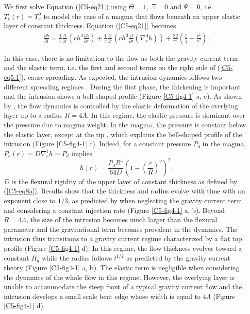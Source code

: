 We first solve Equation  (\ref{C5-eq21}) using $\Theta=1$, $\Xi=0$ and
$\Psi=0$,  i.e. $T_e(r)=T_{e}^0$  to model  the case  of a  magma that
flows beneath an  upper elastic layer of  constant thickness. Equation
(\ref{C5-eq21}) becomes		
\begin{eqnarray}
  \frac{\partial h}{\partial t}=\frac{1}{r} \frac{\partial}{\partial r}\left (rh^{3} \frac{\partial h}{\partial r} \right)+ \frac{1}{r}\frac{\partial}{\partial r}\left ( rh^{3} \frac{\partial}{\partial r}\left ( \nabla^{4}_{r}h \right )\right)+\frac{32}{\gamma^{2}} \left(\frac{1}{4}-\frac{r^{2}}{\gamma^{2}}\right).
  \label{C5-eq5.1}
\end{eqnarray}

In this case, there  is no limitation to the flow  as both the gravity
current term and the elastic term,  i.e. the first and second terms on
the right side of (\ref{C5-eq5.1}),  cause spreading. As expected, the
intrusion   dynamics   follows   two   different   spreading   regimes
\citep{Michaut:2011kg,Michaut:2013dr,Bunger:2011cb}.  During the first
phase,  the  thickening  is  important   and  the  intrusion  shows  a
bell-shaped  profile  (Figure  \ref{C5-fig4-1}  a, c).   As  shown  by
\citet{Michaut:2011kg}, the flow dynamics is controlled by the elastic
deformation of  the overlying  layer up to  a radius  $R=4\Lambda$. In
this regime, the elastic pressure is dominant over the pressure due to
magma weight. In the magma, the pressure is constant below the elastic
layer, except  at the tip  \citep{Bunger:2011cb,Michaut:2011kg}, which
explains   the   bell-shaped   profile  of   the   intrusion   (Figure
\ref{C5-fig4-1}  c). Indeed,  for  a constant  pressure  $P_d$ in  the
magma, $P_e(r)=D\nabla_r^4h=P_d$ implies
\begin{equation}
  h(r)=\frac{P_{d} R^{4}}{64D}\left(1-\left(\frac{r}{R}\right)^2\right)^2.
  \label{C5-eq4-1}
\end{equation}
$D$ is the flexural rigidity of  the upper layer of constant thickness
as defined  by (\ref{C5-eq8a}).  Results  show that the  thickness and
radius evolve with time with an  exponent close to $1/3$, as predicted
by \citet{Michaut:2011kg} when neglecting the gravity current term and
considering  a  constant  injection rate  (Figure  \ref{C5-fig4-1}  a,
b). Beyond $R=4\Lambda$, the size of the intrusion becomes much larger
than  the  flexural  parameter  and  the  gravitational  term  becomes
prevalent in the dynamics. The intrusion thus transitions to a gravity
current   regime  characterized   by  a   flat  top   profile  (Figure
\ref{C5-fig4-1} d).  In this regime, the flow thickness evolves toward
a constant  $H_g$ while the  radius follows $t^{1/2}$ as  predicted by
the    gravity    current   theory    \citep{Huppert:1982a}    (Figure
\ref{C5-fig4-1} a, b). The elastic term is negligible when considering
the dynamics of the whole flow in this regime.  However, the overlying
layer is  unable to accommodate the  steep front of a  typical gravity
current flow \citep{Huppert:1982a} and  the intrusion develops a small
scale  bent   edge  whose  width   is  equal  to   $4\Lambda$  (Figure
\ref{C5-fig4-1} d).
		
